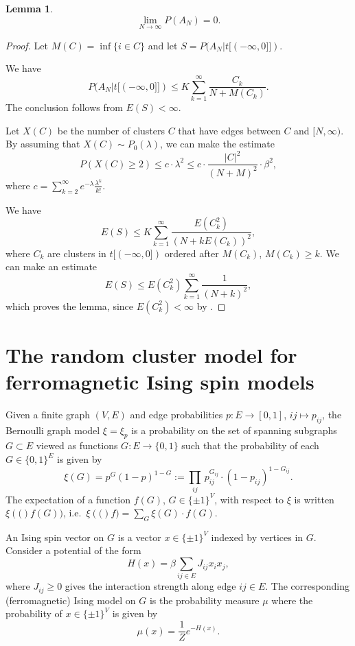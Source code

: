 \documentclass[11pt, a4paper, oneside]{article}
\newtheorem{lem}[thm]{Lemma}
\theoremstyle{definition}
\theoremstyle{remark}
\begin{document}
\begin{lem}
$$\lim_{N\to \infty} P(A_N)=0.$$
\end{lem}

\begin{proof}
  Let $M(C)=\inf \{i\in C \}$ and let $S=P(A_N |t[(-\infty, 0]])$.

  We have
$$P(A_N|t[(-\infty, 0]])\leq K \sum_{k=1}^\infty \frac{C_k}{N+M(C_k)}.$$
The conclusion follows from $E(S)<\infty$.

Let $X(C)$ be the number of clusters $C$ that have edges between $C$ and
$[N,\infty)$. By assuming that $X(C)\sim P_0(\lambda)$, we can make the estimate
$$P(X(C)\geq 2)\leq c\cdot \lambda^2 \leq c\cdot \frac{|C|^2}{(N+M)^2}\cdot \beta^2,$$
where $c=\sum_{k=2}^\infty e^{-\lambda} \frac{\lambda^k}{k!}$.

We have
$$E(S) \leq K \sum_{k=1}^\infty \frac{E(C_k^2)}{(N+k E(C_k))^2},$$
where $C_k$ are clusters in $t[(-\infty, 0])$ ordered after $M(C_k)$,
$M(C_k)\geq k$. We can make an estimate
$$E(S)\leq E(C_k^2)\sum _{k=1}^\infty \frac{1}{(N+k)^2},$$
which proves the lemma, since $E(C_k^2)<\infty$ by \cite{kesten}.

\end{proof}

\section{The random cluster model for ferromagnetic Ising spin models}

\def\SI{\{\pm1\}}
\def\SB{\{0,1\}}
\def\b{b}
\def\XI#1{\xi\left(#1\right)}
\def\t{G}

Given a finite graph $(V,E)$ and edge probabilities $p:E\to[0,1]$, $ij\mapsto p_{ij}$, the
Bernoulli graph model $\xi = \xi_p$ is a probability on the set of spanning subgraphs
$\t\subset E$ viewed as functions $\t:E\to\{0,1\}$ such that the probability of each
$\t\in\{0,1\}^E$ is given by
\[ \xi(\t) = p^\t(1-p)^{1-\t} := \prod_{ij}\, p_{ij}^{\t_{ij}}\cdot
  (1-p_{ij})^{1-\t_{ij}}. \]
The expectation of a function $f(\t)$, $\t\in\SI^V$,
with respect to $\xi$ is written $\XI(f(\t))$, i.e.\
\(\XI(f) = \sum_{\t} \xi(\t)\cdot f(\t)\).

An Ising spin vector on $G$ is a vector $x\in\SI^V$ indexed by vertices in $G$.
Consider a potential of the form
\[ H(x) = \beta \sum_{ij\in E} J_{ij} x_i x_j, \] where $J_{ij}\geq 0$ gives the
interaction strength along edge $ij\in E$. The corresponding (ferromagnetic)
Ising model on $G$ is the probability measure $\mu$ where the probability of
$x\in \SI^V$ is given by
\[ \mu(x) = \frac 1{Z} e^{-H(x)}. \]
\end{document}
